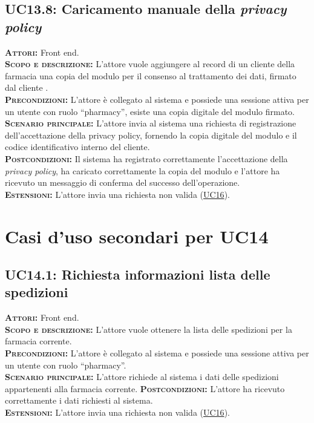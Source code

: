 \subsection{UC13.8: Caricamento manuale della \textit{privacy policy}}
\label{sec:UC138}
\textsc{\textbf{Attori:}} Front end.\\
\textsc{\textbf{Scopo e descrizione:}} L'attore vuole aggiungere al record di un cliente della farmacia una copia del modulo per il consenso al trattamento dei dati, firmato dal cliente .\\
\textsc{\textsc{\textbf{Precondizioni:}}} L'attore è collegato al sistema e possiede una sessione attiva per un utente con ruolo ``pharmacy'', esiste una copia digitale del modulo firmato.\\
\textsc{\textbf{Scenario principale:}} L'attore invia al sistema una richiesta di registrazione dell'accettazione della privacy policy, fornendo la copia digitale del modulo e il codice identificativo interno del cliente.\\
\textsc{\textbf{Postcondizioni:}} Il sistema ha registrato correttamente l'accettazione della \textit{privacy policy}, ha caricato correttamente la copia del modulo e l'attore ha ricevuto un messaggio di conferma del successo dell'operazione.\\
\textsc{\textbf{Estensioni:}} L'attore invia una richiesta non valida (\hyperref[sec:UC16]{UC16}).
    
\section{Casi d'uso secondari per UC14}\subsection{UC14.1: Richiesta informazioni lista delle spedizioni}
\label{sec:UC141}
\textsc{\textbf{Attori:}} Front end.\\
\textsc{\textbf{Scopo e descrizione:}} L'attore vuole ottenere la lista delle spedizioni per la farmacia corrente.\\
\textsc{\textsc{\textbf{Precondizioni:}}} L'attore è collegato al sistema e possiede una sessione attiva per un utente con ruolo ``pharmacy''.\\
\textsc{\textbf{Scenario principale:}} L'attore richiede al sistema i dati delle spedizioni appartenenti alla farmacia corrente.
\textsc{\textbf{Postcondizioni:}} L'attore ha ricevuto correttamente i dati richiesti al sistema.\\
\textsc{\textbf{Estensioni:}} L'attore invia una richiesta non valida (\hyperref[sec:UC16]{UC16}).\\

